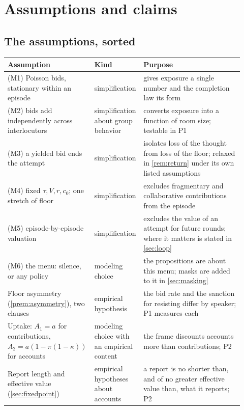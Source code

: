 \section{Assumptions and claims}\label{app:assumptions}

\subsection{The assumptions, sorted}

\begin{center}\small
\begin{tabular}{p{0.3\linewidth} p{0.2\linewidth} p{0.42\linewidth}}
\toprule
Assumption & Kind & Purpose \\
\midrule
(M1) Poisson bids, stationary within an episode & simplification & gives exposure a single number and the completion law its form \\
(M2) bids add independently across interlocutors & simplification about group behavior & converts exposure into a function of room size; testable in P1 \\
(M3) a yielded bid ends the attempt & simplification & isolates loss of the thought from loss of the floor; relaxed in \autoref{rem:return} under its own listed assumptions \\
(M4) fixed $\tau, V, r, c_0$; one stretch of floor & simplification & excludes fragmentary and collaborative contributions from the episode \\
(M5) episode-by-episode valuation & simplification & excludes the value of an attempt for future rounds; where it matters is stated in \autoref{sec:loop} \\
(M6) the menu: silence, or any policy & modeling choice & the propositions are about this menu; masks are added to it in \autoref{sec:masking} \\
Floor asymmetry (\autoref{prem:asymmetry}), two clauses & empirical hypothesis & the bid rate and the sanction for resisting differ by speaker; P1 measures each \\
Uptake: $A_1 = a$ for contributions, $A_2 = a(1-\pi(1-\kappa))$ for accounts & modeling choice with an empirical content & the frame discounts accounts more than contributions; P2 \\
Report length and effective value (\autoref{sec:fixedpoint}) & empirical hypotheses about accounts & a report is no shorter than, and of no greater effective value than, what it reports; P2 \\

\end{tabular}
\end{center}
